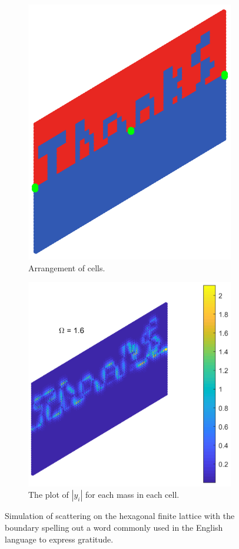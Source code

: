 \begin{figure}[!h]
\centering
\begin{subfigure}[b]{.5\textwidth}
  \centering
  \includegraphics[width=0.7\linewidth]{imgs/thanksarr.png}
  \caption{Arrangement of cells.}
  \label{fig:sub1}
\end{subfigure}%
\begin{subfigure}[b]{.5\textwidth}
  \centering
  \includegraphics[width=1\linewidth]{imgs/thanksscat.png}
  \caption{The plot of $|y_i|$ for each mass in each cell.}
  \label{fig:sub2}
\end{subfigure}
\caption{Simulation of scattering on the hexagonal finite lattice with the
boundary spelling out a word commonly used in the English language to express
gratitude.}
\label{fig:thanks}
\end{figure}
